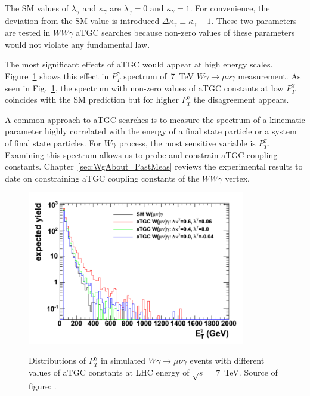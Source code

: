 The SM values of $\lambda_\gamma$ and $\kappa_\gamma$ are $\lambda_\gamma=0$ and $\kappa_\gamma=1$. For convenience, the deviation from the SM value is introduced $\Delta \kappa_\gamma \equiv \kappa_\gamma-1$. These two parameters are tested in $WW\gamma$ aTGC searches because non-zero values of these parameters would not violate any fundamental law.

The most significant effects of aTGC would appear at high energy scales. Figure~\ref{fig:aTGC_Pt_Wg} shows this effect in $P_T^\gamma$ spectrum of~7~TeV $W\gamma \rightarrow \mu\nu\gamma$ measurement. As seen in Fig.~\ref{fig:aTGC_Pt_Wg}, the spectrum with non-zero values of aTGC constants at low $P_T^{\gamma}$ coincides with the SM prediction but for higher $P_T^{\gamma}$ the disagreement appears.

A common approach to aTGC searches is to measure the spectrum of a kinematic parameter highly correlated with the energy of a final state particle or a system of final state particles. For $W\gamma$ process, the most sensitive variable is $P_T^\gamma$. Examining this spectrum allows us to probe and constrain aTGC coupling constants. Chapter~\ref{sec:WgAbout_PastMeas} reviews the experimental results to date on constraining aTGC coupling constants of the $WW\gamma$ vertex.
 
\begin{figure}[htb]
  \begin{center}
    {\includegraphics[width=0.85\textwidth]{../figs/WgAbout/aTGC_Pt_Wg.png}}
    \caption{Distributions of $P_T^\gamma$ in simulated $W\gamma\rightarrow\mu\nu\gamma$ events with different values of aTGC constants at LHC energy of $\sqrt{s}=7$~TeV. Source of figure:  \cite{ref_Senka_thesis}.}
    \label{fig:aTGC_Pt_Wg}
  \end{center}
\end{figure}
